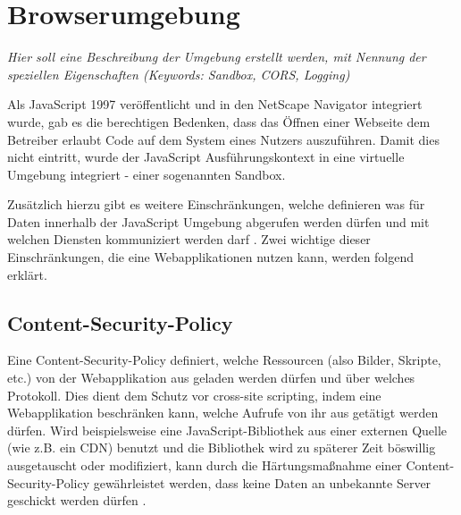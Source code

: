 \section{Browserumgebung}

\textit{Hier soll eine Beschreibung der Umgebung erstellt werden, mit Nennung der speziellen Eigenschaften (Keywords: Sandbox, CORS, Logging)}

Als JavaScript 1997 veröffentlicht und in den NetScape Navigator integriert wurde, gab es die berechtigen Bedenken, dass das Öffnen einer Webseite dem Betreiber erlaubt Code auf dem System eines Nutzers auszuführen. Damit dies nicht eintritt, wurde der JavaScript Ausführungskontext in eine virtuelle Umgebung  integriert - einer sogenannten Sandbox. \cite{LearningJavaScript}

Zusätzlich hierzu gibt es weitere Einschränkungen, welche definieren was für Daten innerhalb der JavaScript Umgebung abgerufen werden dürfen und mit welchen Diensten kommuniziert werden darf \cite{LearningJavaScript}. Zwei wichtige dieser Einschränkungen, die eine Webapplikationen nutzen kann, werden folgend erklärt.


\subsection{Content-Security-Policy}


Eine Content-Security-Policy definiert, welche Ressourcen (also Bilder, Skripte, etc.) von der Webapplikation aus geladen werden dürfen und über welches Protokoll. Dies dient dem Schutz vor cross-site scripting, indem eine Webapplikation beschränken kann, welche Aufrufe von ihr aus getätigt werden dürfen. Wird beispielsweise eine JavaScript-Bibliothek aus einer externen Quelle (wie z.B. ein CDN) benutzt und die Bibliothek wird zu späterer Zeit böswillig ausgetauscht oder modifiziert, kann durch die Härtungsmaßnahme einer Content-Security-Policy gewährleistet werden, dass keine Daten an unbekannte Server geschickt werden dürfen \cite{MDNContentSecurityPolicy}.

